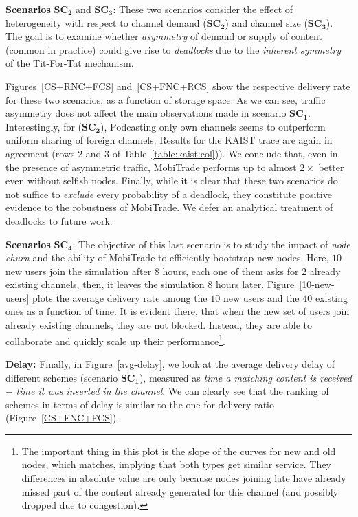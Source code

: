 \noindent \textbf{Scenarios} $\mathbf{SC_{2}}$ and $\mathbf{SC_{3}}$: These two scenarios consider the effect of heterogeneity with respect to channel demand ($\mathbf{SC_{2}}$) and channel size ($\mathbf{SC_{3}}$). The goal is to examine whether \emph{asymmetry} of demand or supply of content (common in practice) could give rise to \emph{deadlocks} due to the \emph{inherent symmetry} of the Tit-For-Tat mechanism.

Figures~\ref{CS+RNC+FCS} and~\ref{CS+FNC+RCS} show the respective delivery rate for these two scenarios, as a function of storage space. As we can see, traffic asymmetry does not affect the main observations made in scenario $\mathbf{SC_{1}}$. Interestingly,  for ($\mathbf{SC_{2}}$), Podcasting only own channels seems to outperform uniform sharing of foreign channels. Results for the KAIST trace are again in agreement (rows 2 and 3 of Table~\ref{table:kaist:col})). We conclude that, even in the presence of asymmetric traffic, MobiTrade performs up to almost $2\times$ better even without selfish nodes. Finally, while it is clear that these two scenarios do not suffice to \emph{exclude} every probability of a deadlock, they constitute positive evidence to the robustness of MobiTrade. We defer an analytical treatment of deadlocks to future work.


\noindent \textbf{Scenarios} $\mathbf{SC_{4}}$: The objective of this last scenario is to study the impact of \emph{node churn} and the ability of MobiTrade to efficiently bootstrap new nodes. Here, $10$ new users join the simulation after $8$ hours, each one of them asks for $2$ already existing channels, then, it leaves the simulation $8$ hours later. Figure~\ref{10-new-users} plots the average delivery rate among the $10$ new users and the $40$ existing ones as a function of time.
It is evident there, that when the new set of users join already existing channels, they are not blocked. Instead, they are able to collaborate and quickly scale up their performance\footnote{The important thing in this plot is the slope of the curves for new and old nodes, which matches, implying that both types get 
similar service. They differences in absolute value are only because nodes joining late have already missed part of the content already generated for this channel (and possibly dropped due to congestion).}.

\noindent \textbf{Delay:} Finally, in Figure~\ref{avg-delay}, we look at the average delivery delay of different schemes (scenario $\mathbf{SC_{1}}$), measured as \emph{time a matching content is received} $-$ \emph{time it was inserted in the channel}. We can clearly see that the ranking of schemes in terms of delay is similar to the one for delivery ratio (Figure~\ref{CS+FNC+FCS}).

